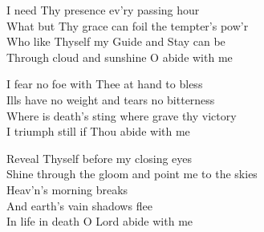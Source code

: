 \documentclass{beamer}
\begin{document}
{\hypertarget{Abide with me[]3}{}
\begin{frame}{}
\fontsize{ 15 }{ 19 }\selectfont

I need Thy presence ev'ry passing hour\\ 
What but Thy grace can foil the tempter's pow'r\\ 
Who like Thyself my Guide and Stay can be\\ 
Through cloud and sunshine O abide with me 

\end{frame}

\hypertarget{Abide with me[]4}{}
\begin{frame}{}
\fontsize{ 15 }{ 19 }\selectfont

I fear no foe with Thee at hand to bless\\ 
Ills have no weight and tears no bitterness\\ 
Where is death's sting where grave thy victory\\ 
I triumph still if Thou abide with me 

\end{frame}

\hypertarget{Abide with me[]5}{}
\begin{frame}{}
\fontsize{ 15 }{ 19 }\selectfont

Reveal Thyself before my closing eyes\\ 
Shine through the gloom and point me to the skies\\ 
Heav'n's morning breaks\\ 
And earth's vain shadows flee\\ 
In life in death O Lord abide with me 

\end{frame}

}
\end{document}
